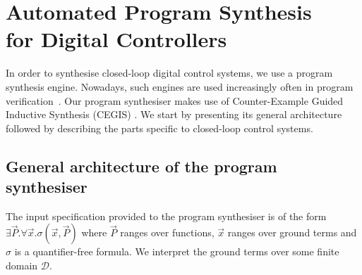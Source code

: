 \documentclass{sig-alternate-05-2015}
\newcommand{\red}[1]{{\color{red}#1}}
\begin{document}


\section{Automated Program Synthesis \\ for Digital Controllers}


In order to synthesise closed-loop digital control systems, we use a
program synthesis engine.  Nowadays, such engines are used
increasingly often in program
verification~\cite{DBLP:conf/lpar/DavidKL15,DBLP:conf/cav/0001A14}.
Our program synthesiser makes use of Counter-Example Guided Inductive
Synthesis (CEGIS) \cite{sketch}.  We start by presenting its general
architecture followed by describing the parts specific to closed-loop
control systems.


\subsection{General architecture of the program synthesiser}
\label{synthesiser-general}
%
% 
The input specification provided to the program synthesiser is of the
form $\exists \vec{P} . \forall \vec{x}. \sigma(\vec{x}, \vec{P})$ where $\vec{P}$ ranges over functions,
$\vec{x}$ ranges over ground terms and $\sigma$ is a quantifier-free
formula.  We interpret the ground terms over some finite domain
$\mathcal{D}$.
\end{document}
